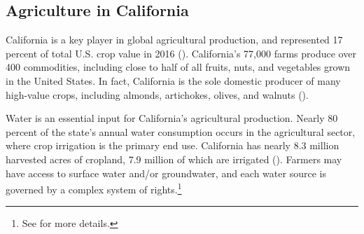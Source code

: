 %
%

\subsection{Agriculture in California}
California is a key player in global agricultural production, and represented 17 percent of total U.S. crop value in 2016 (\textcite{crs2015}). California's 77,000 farms produce over 400 commodities, including close to half of all fruits, nuts, and vegetables grown in the United States. In fact, California is the sole domestic producer of many high-value crops, including almonds, artichokes, olives, and walnuts (\textcite{cdfa2011}).  

Water is an essential input for California's agricultural production. Nearly 80 percent of the state's annual water consumption occurs in the agricultural sector, where crop irrigation is the primary end use. California has nearly 8.3 million harvested acres of cropland, 7.9 million of which are irrigated (\textcite{crs2015}). Farmers may have access to surface water and/or groundwater, and each water source is governed by a complex system of rights.\footnote{See \textcite{sawyers2007} for more details.} 


